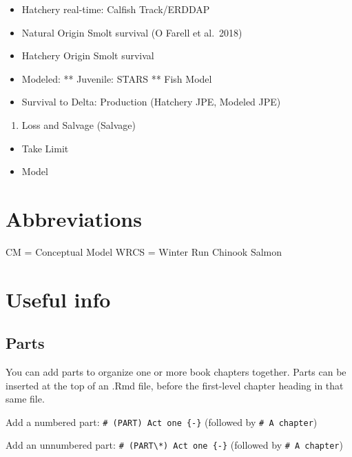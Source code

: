 \documentclass[
]{book}
\providecommand{\tightlist}{%
  \setlength{\itemsep}{0pt}\setlength{\parskip}{0pt}}
\theoremstyle{definition}
\theoremstyle{definition}
\theoremstyle{definition}
\theoremstyle{definition}
\theoremstyle{remark}
\begin{document}
\begin{itemize}
\tightlist
\item
  Hatchery real-time: Calfish Track/ERDDAP
\item
  Natural Origin Smolt survival (O Farell et al.~2018)
\item
  Hatchery Origin Smolt survival
\item
  Modeled:
  ** Juvenile: STARS
  ** Fish Model
\item
  Survival to Delta: Production (Hatchery JPE, Modeled JPE)
\end{itemize}

\begin{enumerate}
\def\labelenumi{\arabic{enumi}.}
\setcounter{enumi}{6}
\tightlist
\item
  Loss and Salvage (Salvage)
\end{enumerate}

\begin{itemize}
\tightlist
\item
  Take Limit
\item
  Model
\end{itemize}

\hypertarget{abbreviations}{%
\chapter{Abbreviations}\label{abbreviations}}

CM = Conceptual Model
WRCS = Winter Run Chinook Salmon

\hypertarget{useful-info}{%
\chapter{Useful info}\label{useful-info}}

\hypertarget{parts}{%
\section{Parts}\label{parts}}

You can add parts to organize one or more book chapters together. Parts can be inserted at the top of an .Rmd file, before the first-level chapter heading in that same file.

Add a numbered part: \texttt{\#\ (PART)\ Act\ one\ \{-\}} (followed by \texttt{\#\ A\ chapter})

Add an unnumbered part: \texttt{\#\ (PART\textbackslash{}*)\ Act\ one\ \{-\}} (followed by \texttt{\#\ A\ chapter})
\end{document}
